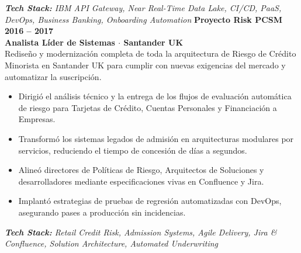\documentclass[10pt,a4paper]{article}
\begin{document}
\noindent\textit{\footnotesize \textbf{Tech Stack:} IBM API Gateway, Near Real-Time Data Lake, CI/CD, PaaS, DevOps, Business Banking, Onboarding Automation}
\vspace{10pt}
\noindent\textbf{\large Proyecto Risk PCSM} \hfill {\color{SynthBlue}\textbf{2016 -- 2017}} \\
{\color{SynthPink}\textbf{Analista Líder de Sistemas $\cdot$ Santander UK}} \\
\vspace{2pt}
Rediseño y modernización completa de toda la arquitectura de Riesgo de Crédito Minorista en Santander UK para cumplir con nuevas exigencias del mercado y automatizar la suscripción.
\begin{itemize}[leftmargin=1.5em, itemsep=1.5pt, topsep=2pt]
    \item Dirigió el análisis técnico y la entrega de los flujos de evaluación automática de riesgo para Tarjetas de Crédito, Cuentas Personales y Financiación a Empresas.
    \item Transformó los sistemas legados de admisión en arquitecturas modulares por servicios, reduciendo el tiempo de concesión de días a segundos.
    \item Alineó directores de Políticas de Riesgo, Arquitectos de Soluciones y desarrolladores mediante especificaciones vivas en Confluence y Jira.
    \item Implantó estrategias de pruebas de regresión automatizadas con DevOps, asegurando pases a producción sin incidencias.
\end{itemize}
\noindent\textit{\footnotesize \textbf{Tech Stack:} Retail Credit Risk, Admission Systems, Agile Delivery, Jira \& Confluence, Solution Architecture, Automated Underwriting}
\vspace{10pt}


\end{document}
